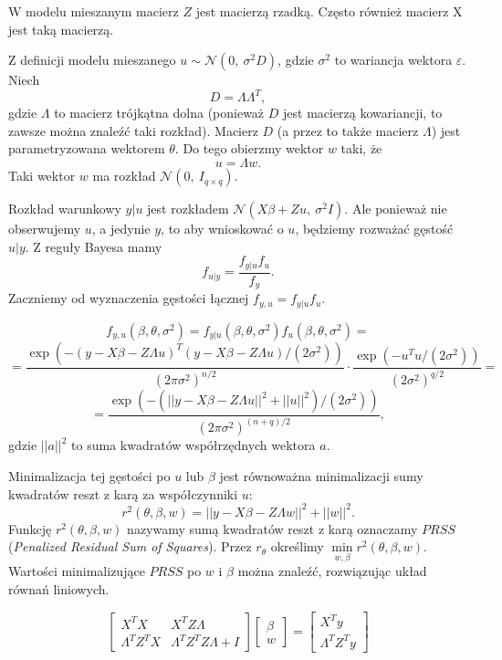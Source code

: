 \documentclass[12pt]{mwbk}
\theoremstyle{plain}
\theoremstyle{definition}
\theoremstyle{remark}
\begin{document}
W modelu mieszanym macierz $Z$ jest macierzą rzadką. Często również macierz X jest taką macierzą.

Z definicji modelu mieszanego $u \sim \mathcal{N}(0,~\sigma^2D)$, gdzie $\sigma^2$ to wariancja wektora $\varepsilon$. Niech $$D=\Lambda \Lambda^T,$$ gdzie $\Lambda$ to macierz trójkątna dolna (ponieważ $D$ jest macierzą kowariancji, to zawsze można znaleźć taki rozkład). Macierz $D$ (a przez to także macierz $\Lambda$) jest parametryzowana wektorem $\theta$. Do tego obierzmy wektor $w$ taki, że $$u=\Lambda w.$$ Taki wektor $w$ ma rozkład $\mathcal{N}(0,~I_{q \times q})$.

Rozkład warunkowy $y|u$ jest rozkładem $\mathcal{N}(X\beta+Zu,~\sigma^2I)$. Ale ponieważ nie obserwujemy $u$, a jedynie $y$, to aby wnioskować o $u$, będziemy rozważać gęstość $u|y$. Z reguły Bayesa mamy $$f_{u|y}=\frac{f_{y|u}f_u}{f_y}.$$ Zaczniemy od wyznaczenia gęstości łącznej $f_{y,u}=f_{y|u}f_u$.

$$f_{y,u}(\beta, \theta, \sigma^2)=f_{y|u}(\beta, \theta, \sigma^2)f_u(\beta, \theta, \sigma^2)=$$
$$=\frac{\exp(-(y-X\beta -Z \Lambda u)^T(y-X\beta-Z\Lambda u)/(2\sigma^2))}{(2\pi \sigma^2)^{n/2}}\cdot \frac{\exp(-u^Tu/(2\sigma^2))}{(2\sigma^2)^{q/2}}=$$
$$=\frac{\exp(-(||y-X\beta-Z\Lambda u||^2+||u||^2)/(2\sigma^2))}{(2\pi \sigma^2)^{(n+q)/2}},$$ gdzie $||a||^2$ to suma kwadratów współrzędnych wektora $a$.

Minimalizacja tej gęstości po $u$ lub $\beta$ jest równoważna minimalizacji sumy kwadratów reszt z karą za współczynniki $u$:
$$r^2(\theta, \beta, w)=||y-X\beta-Z\Lambda w||^2+||w||^2.$$ Funkcję $r^2(\theta, \beta, w)$ nazywamy sumą kwadratów reszt z karą oznaczamy $PRSS$ (\textit{Penalized Residual Sum of Squares}). Przez $r_{\theta}$ określimy $\min\limits_{w,\beta} r^2(\theta, \beta,w)$. Wartości minimalizujące $PRSS$ po $w$ i $\beta$ można znaleźć, rozwiązując układ równań liniowych.

\begin{equation} \label{eq:ukladPRSS}
\begin{bmatrix}
X^TX & X^TZ\Lambda \\
\Lambda^TZ^TX & \Lambda^TZ^TZ\Lambda +I
\end{bmatrix}
\begin{bmatrix}
\beta \\
w
\end{bmatrix}=
\begin{bmatrix}
X^Ty\\
\Lambda^TZ^Ty
\end{bmatrix}
\end{equation}
\end{document}
